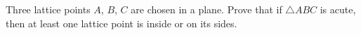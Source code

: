 Three lattice points $A$, $B$, $C$ are chosen in a plane. Prove that if $\triangle ABC$ is acute, then at least one lattice point is inside or on its sides.
